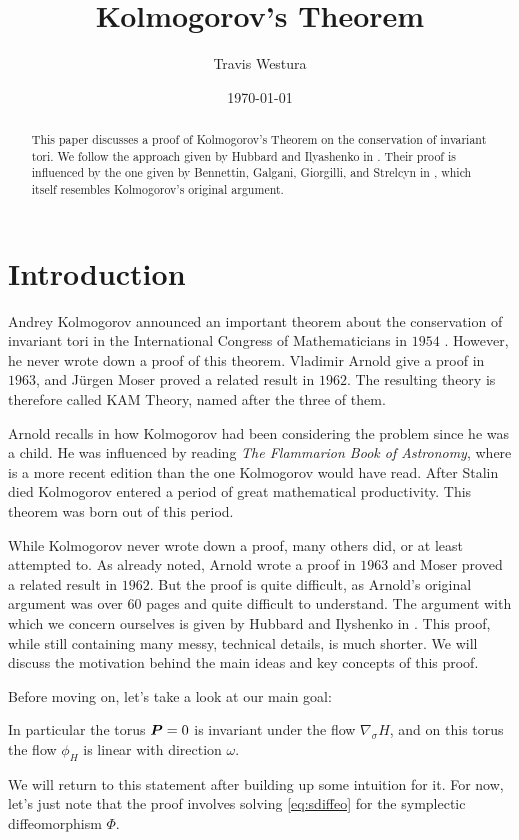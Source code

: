 \documentclass[twoside,letterpaper,11pt]{article}
\title{Kolmogorov's Theorem}
\author{Travis Westura}
\date{\today}
\newcommand{\sgrad}{\nabla_{\sigma}}
\numberwithin{equation}{section}
\begin{document}
\maketitle

\begin{abstract}
  This paper discusses a proof of Kolmogorov's Theorem on the conservation of
  invariant tori.
  We follow the approach given by Hubbard and Ilyashenko in \cite{hi02}.
  Their proof is influenced by the one given by Bennettin, Galgani, Giorgilli,
  and Strelcyn in \cite{bggs84}, which itself resembles Kolmogorov's original
  argument.
\end{abstract}

\section{Introduction}
\label{sec:introduction}

Andrey Kolmogorov announced an important theorem about the conservation of
invariant tori in the International Congress of Mathematicians in $1954$
\cite{kol54}.
However, he never wrote down a proof of this theorem.
Vladimir Arnold give a proof in $1963$, and J{\"u}rgen Moser proved a related
result in $1962$.
The resulting theory is therefore called KAM Theory, named after the three of
them.

Arnold recalls in \cite{a97} how Kolmogorov had been considering the problem
since he was a child.
He was influenced by reading \emph{The Flammarion Book of Astronomy}, where
\cite{f64} is a more recent edition than the one Kolmogorov would have read.
After Stalin died Kolmogorov entered a period of great mathematical
productivity.
This theorem was born out of this period.

While Kolmogorov never wrote down a proof, many others did, or at least
attempted to.
As already noted, Arnold wrote a proof \cite{a63} in $1963$ and Moser proved a
related result \cite{mos62} in $1962$.
But the proof is quite difficult, as Arnold's original argument was over $60$
pages and quite difficult to understand.
The argument with which we concern ourselves is given by Hubbard and Ilyshenko
in \cite{hi02}.
This proof, while still containing many messy, technical details, is much
shorter.
We will discuss the motivation behind the main ideas and key concepts of this
proof.

Before moving on, let's take a look at our main goal:
\begin{thm}
  \label{thm:KAM}
  \KAM{} In particular the torus $\bm{P} = 0$ is invariant under the flow
  $\sgrad H$, and on this torus the flow $\phi_H$ is linear with direction
  $\omega$.
\end{thm}
We will return to this statement after building up some intuition for it.
For now, let's just note that the proof involves solving \cref{eq:sdiffeo} for
the symplectic diffeomorphism $\Phi$.
\end{document}
